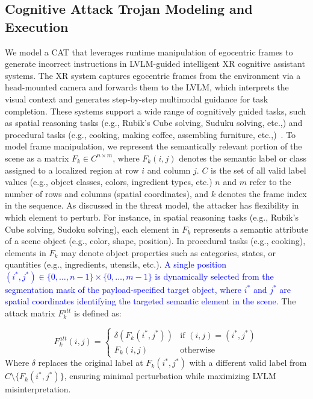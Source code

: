 \documentclass[sigconf,review,anonymous]{acmart}
\begin{document}
\subsection{Cognitive Attack Trojan Modeling and Execution}
\label{sec: model_cognitive}
We model a  CAT that leverages runtime manipulation of egocentric frames to generate incorrect instructions in LVLM-guided intelligent XR cognitive assistant systems. The XR system captures egocentric frames from the environment via a head-mounted camera and forwards them to the LVLM, which interprets the visual context and generates step-by-step multimodal guidance for task completion. These systems support a wide range of cognitively guided tasks, such as spatial reasoning tasks (e.g., Rubik's Cube solving, Suduku solving, etc.,) and procedural tasks (e.g., cooking, making coffee, assembling furniture, etc.,)~\cite{wang2025cuberobot, ren2025rubikon, srinidhi2024xair, ghasemi2023embedding, zhao2025guided, qorbani2025teaching, dugar2024augmented, vir2024archef, lau2025adaptive, qu2024looking}. To model frame manipulation, we represent the semantically relevant portion of the scene as a matrix \( F_k \in C^{n \times m} \), where \( F_k(i, j) \) denotes the semantic label or class assigned to a localized region at row \( i \) and column \( j \). \( C \) is the set of all valid label values (e.g., object classes, colors, ingredient types, etc.) \( n \) and \( m \) refer to the number of rows and columns (spatial coordinates), and \( k \) denotes the frame index in the sequence. As discussed in the threat model, the attacker has flexibility in which element to perturb. For instance, in spatial reasoning tasks (e.g., Rubik's Cube solving, Sudoku solving), each element in \( F_k \) represents a semantic attribute of a scene object (e.g., color, shape, position). In procedural tasks (e.g., cooking), elements in \( F_k \) may denote object properties such as categories, states, or quantities (e.g., ingredients, utensils, etc.). \textcolor{blue}{A single position \( (i^*, j^*) \in \{0, \dots, n-1\} \times \{0, \dots, m-1\} \) is dynamically selected from the segmentation mask of the payload-specified target object, where \( i^* \) and \( j^* \) are spatial coordinates identifying the targeted semantic element in the scene.} The attack matrix \( F_k^{att} \) is defined as:

\[
F_k^{att}(i, j) =
\begin{cases}
\delta(F_k(i^*, j^*)) & \text{if } (i, j) = (i^*, j^*) \\
F_k(i, j) & \text{otherwise}
\end{cases}
\]
Where \( \delta \) replaces the original label at \( F_k(i^*, j^*) \) with a different valid label from \( C \setminus \{F_k(i^*, j^*)\} \), ensuring minimal perturbation while maximizing LVLM misinterpretation. 
\end{document}
